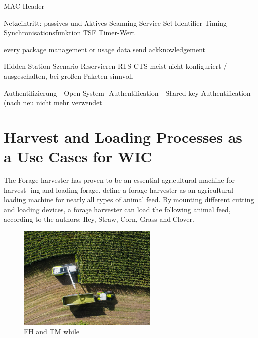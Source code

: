 \documentclass[]{nsm-thesis}
\begin{document}
MAC Header

Netzeintritt:
passives und Aktives Scanning
Service Set Identifier
Timing Synchronisationsfunktion TSF Timer-Wert

\textcite{sauter_wireless_2022}
every package management or usage data send ackknowledgement

Hidden Station Szenario
Reservieren
RTS CTS
meist nicht konfiguriert / ausgeschalten, bei großen Paketen sinnvoll



Authentifizierung
- Open System -Authentification
- Shared key Authentification
(nach neu nicht mehr verwendet

\section{Harvest and Loading Processes as a Use Cases for \acl{WIC}}
The Forage harvester has proven to be an essential agricultural machine for harvest-
ing and loading forage. \textcite{seifert_feldhacksler_1962} define a forage harvester
as an agricultural loading machine for nearly all types of animal feed. By mounting different cutting and loading devices, a forage harvester can load the following animal feed, according to the authors: Hey, Straw, Corn, Grass and Clover.

\begin{figure}%
	\centering
	\includegraphics[width=0.6\textwidth]{figures/claas_harvest_side.png}
	\caption{\ac{FH} and \ac{TM} while }%
	\label{fig:normal}%
\end{figure}
\end{document}
